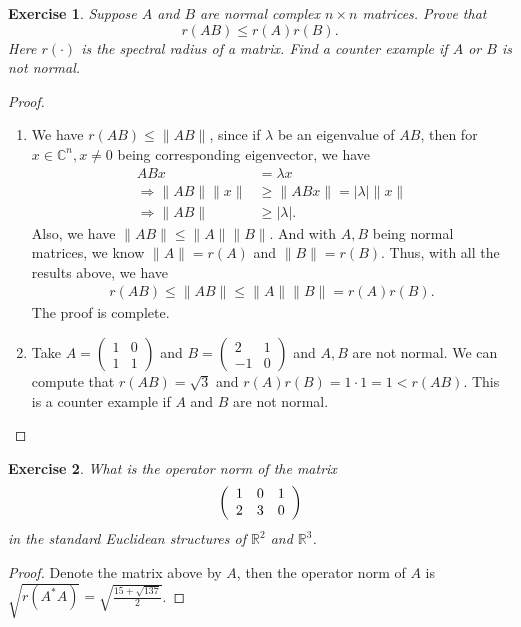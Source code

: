 \documentclass[11pt]{book}
\newtheorem{exercise}{Exercise}[section]
\theoremstyle{definition}
\numberwithin{equation}{subsection}
\begin{document}
\medskip

\begin{exercise}
Suppose $A$ and $B$ are normal complex $n\times n$ matrices. Prove that%
$$
r(AB)\leq r(A)r(B).
$$
Here $r(\cdot)$ is the spectral radius of a matrix. Find a counter example if
$A$ or $B$ is not normal.
\end{exercise}
\begin{proof}
~\begin{enumerate}[label=(\arabic*)]
    \item We have $r(AB)\leq \|AB\|$, since if $\lambda$ be an eigenvalue of $AB$, then for $x\in\mathbb{C}^n, x\neq 0$ being corresponding eigenvector, we have 
    \begin{align*}
        AB x & = \lambda x \\
        \Rightarrow \|AB\|\|x\| & \geq \|AB x\| = |\lambda|\|x\| \\
        \Rightarrow \|AB\| & \geq |\lambda|.
    \end{align*}
    Also, we have $\|AB\|\leq \|A\| \|B\|$. And with $A, B$ being normal matrices, we know $\|A\| = r(A)$ and $\|B\| = r(B)$. Thus, with all the results above, we have 
    \begin{align*}
        r(AB)\leq \|AB\|\leq \|A\| \|B\| = r(A)r(B).
    \end{align*}
    The proof is complete. 
    \item Take $A = \left(
    \begin{matrix}
        1 & 0\\
        1 & 1
        \end{matrix}
    \right)$ and $B = \left(
    \begin{matrix}
        2 & 1\\
        -1 & 0
    \end{matrix}
    \right)$ and $A,B$ are not normal. We can compute that $r(AB) = \sqrt{3}$ and $r(A)r(B) = 1\cdot 1 = 1 < r(AB)$. This is a counter example if $A$ and $B$ are not normal.
\end{enumerate}
\end{proof}

\medskip

\begin{exercise}
What is the operator norm of the matrix%
$$
\left(
\begin{array}
[c]{ccc}%
1 & 0 & 1\\
2 & 3 & 0
\end{array}
\right)
$$
in the standard Euclidean structures of $\mathbb{R}^{2}$ and $\mathbb{R}^{3}$.
\end{exercise}
\begin{proof}
Denote the matrix above by $A$, then the operator norm of $A$ is $\sqrt{r(A^*A)} = \sqrt{\frac{15+\sqrt{137}}{2}}$.
\end{proof}
\end{document}
